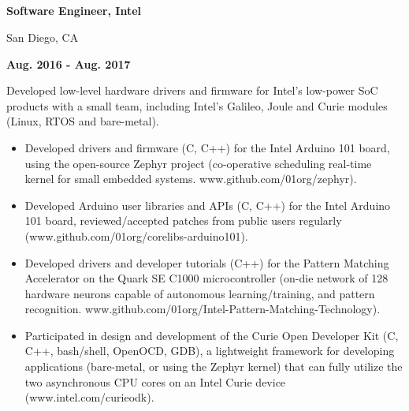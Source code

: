 \documentclass[6pt]{article}
\begin{document}
\begin{minipage}{35em}
%
%
\subsection*{}
\begin{minipage}{20em}
{\bfseries Software Engineer, Intel

San Diego, CA}
\end{minipage}
\hfill
\begin{minipage}{12em}
{\bfseries Aug. 2016 - Aug. 2017}
\end{minipage}
\break
\break
Developed low-level hardware drivers and firmware for Intel's low-power SoC products
with a small team, including Intel's Galileo, Joule and Curie modules (Linux, RTOS and
bare-metal).
\begin{itemize}
    \item Developed drivers and firmware (C, C++) for the Intel Arduino 101 board, using the
          open-source Zephyr project (co-operative scheduling real-time kernel for small
          embedded systems. www.github.com/01org/zephyr).
    \item Developed Arduino user libraries and APIs (C, C++) for the Intel Arduino 101 board,
          reviewed/accepted patches from public users regularly \\
          (www.github.com/01org/corelibs-arduino101).
    \item Developed drivers and developer tutorials (C++) for the Pattern Matching Accelerator
          on the Quark SE C1000 microcontroller (on-die network of 128 hardware neurons
          capable of autonomous learning/training, and pattern recognition.
          www.github.com/01org/Intel-Pattern-Matching-Technology).
    \item Participated in design and development of the Curie Open Developer Kit (C, C++,
          bash/shell, OpenOCD, GDB), a lightweight framework for developing applications
          (bare-metal, or using the Zephyr kernel) that can fully utilize the two asynchronous
          CPU cores on an Intel Curie device (www.intel.com/curieodk).
\end{itemize}
\end{minipage}
%
%
\hspace{2em}
\end{document}
